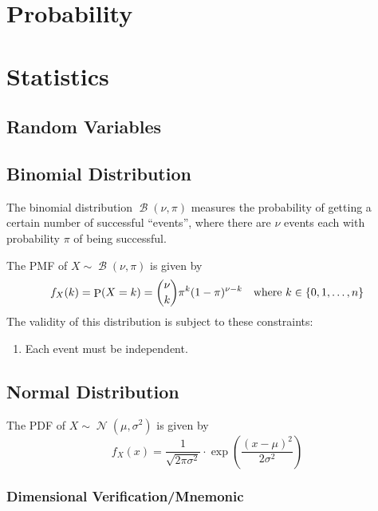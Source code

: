 \documentclass[fleqn,a4paper,11pt]{article}
\DeclareMathOperator{\Normal}{\mathcal{N}}
\DeclareMathOperator{\Binomial}{\mathcal{B}}
\DeclareMathOperator{\Prob}{\mathrm P}
\begin{document}
    \section{Probability}

    \section{Statistics}

    \subsection{Random Variables}

    \subsection{Binomial Distribution}


    The binomial distribution \(\Binomial(\nu, \pi)\) measures the probability
    of getting a certain number of successful ``events'', where there are
    \(\nu\) events each with probability \(\pi\) of being successful.

    The PMF of \(X \sim \Binomial(\nu, \pi)\) is given by
    \begin{equation*}
    f_X(k) = \Prob(X = k) = {\nu \choose k} \pi^k (1 - \pi)^{\nu - k}
        \quad \text{where \(k \in \set{0, 1, \dotsc, n}\)}
    \end{equation*}
    The validity of this distribution is subject to these constraints:
    \begin{enumerate}
    \item Each event must be independent.
    \end{enumerate}

    \subsection{Normal Distribution}


    The PDF of \(X \sim \Normal(\mu, \sigma^2)\) is given by
    \begin{equation*}
    f_X(x) = \frac{1}{\sqrt{2\pi\sigma^2}} \cdot
        \exp(\frac{(x - \mu)^2}{2\sigma^2})
    \end{equation*}

    \subsubsection{Dimensional Verification/Mnemonic}
\end{document}
